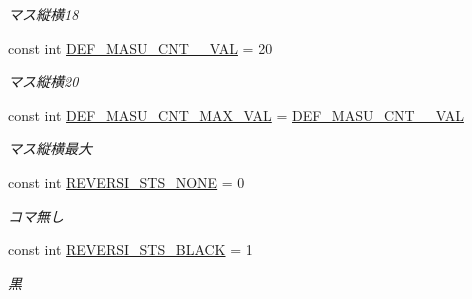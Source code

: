 \begin{DoxyCompactItemize}
\begin{DoxyCompactList}\small\item\em マス縦横18 \end{DoxyCompactList}\item 
\mbox{\label{class_reversi4color_form_1_1_reversi_const_abdfbee8c1fe57f7a406c679984407da3}} 
const int \hyperlink{class_reversi4color_form_1_1_reversi_const_abdfbee8c1fe57f7a406c679984407da3}{D\+E\+F\+\_\+\+M\+A\+S\+U\+\_\+\+C\+N\+T\+\_\+\_\+\+V\+AL} = 20
\begin{DoxyCompactList}\small\item\em マス縦横20 \end{DoxyCompactList}\item 
\mbox{\label{class_reversi4color_form_1_1_reversi_const_a93a4f4023de00c85c510c2fc34738fba}} 
const int \hyperlink{class_reversi4color_form_1_1_reversi_const_a93a4f4023de00c85c510c2fc34738fba}{D\+E\+F\+\_\+\+M\+A\+S\+U\+\_\+\+C\+N\+T\+\_\+\+M\+A\+X\+\_\+\+V\+AL} = \hyperlink{class_reversi4color_form_1_1_reversi_const_abdfbee8c1fe57f7a406c679984407da3}{D\+E\+F\+\_\+\+M\+A\+S\+U\+\_\+\+C\+N\+T\+\_\+\_\+\+V\+AL}
\begin{DoxyCompactList}\small\item\em マス縦横最大 \end{DoxyCompactList}\item 
\mbox{\label{class_reversi4color_form_1_1_reversi_const_a8e61d2e07abac47686be72a7b936d8d2}} 
const int \hyperlink{class_reversi4color_form_1_1_reversi_const_a8e61d2e07abac47686be72a7b936d8d2}{R\+E\+V\+E\+R\+S\+I\+\_\+\+S\+T\+S\+\_\+\+N\+O\+NE} = 0
\begin{DoxyCompactList}\small\item\em コマ無し \end{DoxyCompactList}\item 
\mbox{\label{class_reversi4color_form_1_1_reversi_const_a2e5842a93a9e6db4ca17f0908cd03633}} 
const int \hyperlink{class_reversi4color_form_1_1_reversi_const_a2e5842a93a9e6db4ca17f0908cd03633}{R\+E\+V\+E\+R\+S\+I\+\_\+\+S\+T\+S\+\_\+\+B\+L\+A\+CK} = 1
\begin{DoxyCompactList}\small\item\em 黒 \end{DoxyCompactList}\item 

\end{DoxyCompactItemize}
